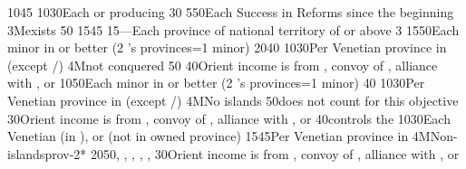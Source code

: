 %
{10}{45}{}%
%
%
{10}{30}{Each \COL or \TP producing \POSPICE}%
%
%
%
{}{30}{}%
%
%
{5}{50}{Each Success in Reforms since the beginning}%
%
\EUobjective3M{\payscrimee exists}{}%
{}{50}{}%
%
%
{15}{45}{}%
%
%
{15}{---}{Each province of national territory of  or
   above 3}%
%
 
%
%
{15}{50}{Each minor in \EG or better (2 's provinces=1 minor)}%
%
%
{20}{40}{}%
%
%
{10}{30}{Per Venetian province in \regionBalkans (except
  \provinceHellas/\provinceMoreas)}%
%
\EUobjective4M{\paysmamelouks not conquered}{}%
{}{50}{}%
%
%
{}{40}{Orient income is from , convoy of \villeIzmir,
  alliance with \paysaden, \paysoman or \paysgujarat}%
%
%
%
{10}{50}{Each minor in \EG or better (2 's provinces=1 minor)}%
%
%
{}{40}{}%
%
%
{10}{30}{Per Venetian province in \regionBalkans (except
  \provinceHellas/\provinceMoreas)}%
%
\EUobjective4M{No \TUR islands}{}%
{}{50}{\provinceRhodos does not count for this objective}%
%
%
{}{30}{Orient income is from , convoy of \villeIzmir,
  alliance with \paysaden, \paysoman or \paysgujarat}%
%
%
%
{}{40}{\paysmajeurVenise controls the }%
%
%
{10}{30}{Each Venetian \Presidio (in ), or \regionBalkans
  (not in owned province)}%
%
%
{15}{45}{Per Venetian province in \regionBalkans}%
%
\EUobjective4M{Non-\TUR islands}{prov-2*}%
{20}{50}{\provinceChypre, \provinceKreta, \provinceCyclades, \provinceCorfu,
  \provinceMalta, \provinceRhodos}%
%
%
%
{}{30}{Orient income is from , convoy of \villeIzmir,
  alliance with \paysaden, \paysoman or \paysgujarat}%
